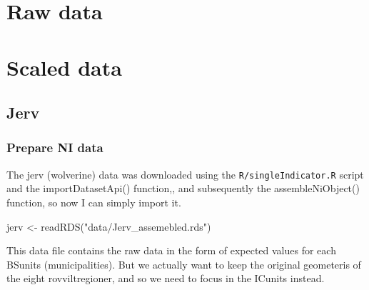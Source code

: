 \documentclass[
]{book}
\newenvironment{Shaded}{\begin{snugshade}}{\end{snugshade}}
\newcommand{\AttributeTok}[1]{\textcolor[rgb]{0.77,0.63,0.00}{#1}}
\newcommand{\DecValTok}[1]{\textcolor[rgb]{0.00,0.00,0.81}{#1}}
\newcommand{\FunctionTok}[1]{\textcolor[rgb]{0.00,0.00,0.00}{#1}}
\newcommand{\NormalTok}[1]{#1}
\newcommand{\OtherTok}[1]{\textcolor[rgb]{0.56,0.35,0.01}{#1}}
\newcommand{\SpecialCharTok}[1]{\textcolor[rgb]{0.00,0.00,0.00}{#1}}
\newcommand{\StringTok}[1]{\textcolor[rgb]{0.31,0.60,0.02}{#1}}
\begin{document}
\hypertarget{raw-data-1}{%
\section{Raw data}\label{raw-data-1}}

\hypertarget{scaled-data-1}{%
\section{Scaled data}\label{scaled-data-1}}

\hypertarget{jerv}{%
\subsection{Jerv}\label{jerv}}

\hypertarget{prepare-ni-data}{%
\subsubsection{Prepare NI data}\label{prepare-ni-data}}

The jerv (wolverine) data was downloaded using the \texttt{R/singleIndicator.R} script and the importDatasetApi() function,, and subsequently the assembleNiObject() function, so now I can simply import it.

\begin{Shaded}
\begin{Highlighting}[]
\NormalTok{jerv }\OtherTok{\textless{}{-}} \FunctionTok{readRDS}\NormalTok{(}\StringTok{"data/Jerv\_assemebled.rds"}\NormalTok{)}
\end{Highlighting}
\end{Shaded}

This data file contains the raw data in the form of expected values for each BSunits (municipalities). But we actually want to keep the original geometeris of the eight rovviltregioner, and so we need to focus in the ICunits instead.

\begin{Shaded}
\end{Shaded}
\end{document}
